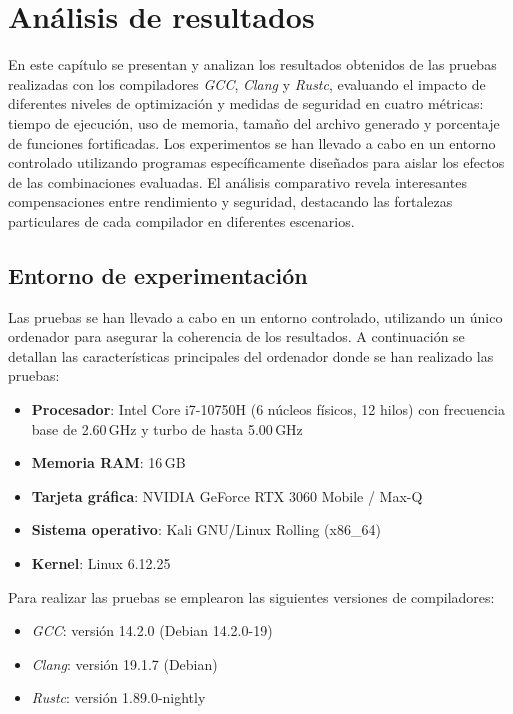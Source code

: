 \chapter{Análisis de resultados}
\label{chap:resultados}

En este capítulo se presentan y analizan los resultados obtenidos de las pruebas realizadas con los compiladores \emph{GCC}, \emph{Clang} y \emph{Rustc}, evaluando el impacto de diferentes niveles de optimización y medidas de seguridad en cuatro métricas: tiempo de ejecución, uso de memoria, tamaño del archivo generado y porcentaje de funciones fortificadas. Los experimentos se han llevado a cabo en un entorno controlado utilizando programas específicamente diseñados para aislar los efectos de las combinaciones evaluadas. El análisis comparativo revela interesantes compensaciones entre rendimiento y seguridad, destacando las fortalezas particulares de cada compilador en diferentes escenarios.

\section{Entorno de experimentación}

Las pruebas se han llevado a cabo en un entorno controlado, utilizando
un único ordenador para asegurar la coherencia de los resultados. A
continuación se detallan las características principales del ordenador
donde se han realizado las pruebas:

\begin{itemize}
\item
  \textbf{Procesador}: Intel Core i7-10750H (6 núcleos físicos, 12
  hilos) con frecuencia base de 2.60\,GHz y turbo de hasta 5.00\,GHz
\item
  \textbf{Memoria RAM}: 16\,GB
\item
  \textbf{Tarjeta gráfica}: NVIDIA GeForce RTX 3060 Mobile / Max-Q
\item
  \textbf{Sistema operativo}: Kali GNU/Linux Rolling (x86\_64)
\item
  \textbf{Kernel}: Linux 6.12.25
\end{itemize}

Para realizar las pruebas se emplearon las siguientes versiones de
compiladores:

\begin{itemize}
\item
  \emph{GCC}: versión 14.2.0 (Debian 14.2.0-19)
\item
  \emph{Clang}: versión 19.1.7 (Debian)
\item
  \emph{Rustc}: versión 1.89.0-nightly
\end{itemize}

